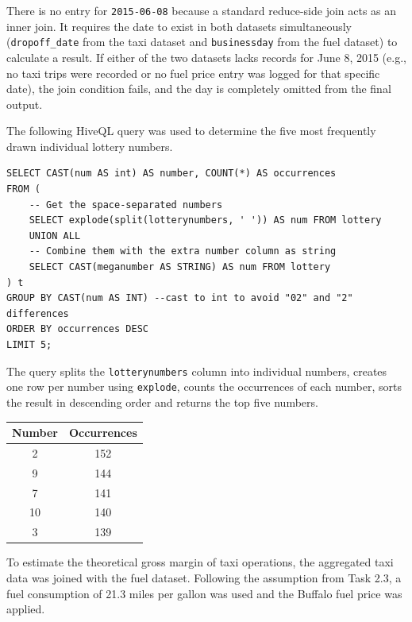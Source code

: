 \documentclass[12pt,ngerman]{scrartcl}
\begin{document}
There is no entry for \texttt{2015-06-08} because a standard reduce-side join acts as an inner join.
It requires the date to exist in both datasets simultaneously (\texttt{dropoff\_date} from the taxi dataset and \texttt{businessday} from the fuel dataset) to calculate a result.
If either of the two datasets lacks records for June 8, 2015 (e.g., no taxi trips were recorded or no fuel price entry was logged for that specific date), the join condition fails, and the day is completely omitted from the final output.

\newpage
{}
\subexercise{}

The following HiveQL query was used to determine the five most frequently drawn individual lottery numbers.

\begin{verbatim}
SELECT CAST(num AS int) AS number, COUNT(*) AS occurrences
FROM (
    -- Get the space-separated numbers
    SELECT explode(split(lotterynumbers, ' ')) AS num FROM lottery
    UNION ALL
    -- Combine them with the extra number column as string
    SELECT CAST(meganumber AS STRING) AS num FROM lottery 
) t
GROUP BY CAST(num AS INT) --cast to int to avoid "02" and "2" differences
ORDER BY occurrences DESC
LIMIT 5;
\end{verbatim}

The query splits the \texttt{lotterynumbers} column into individual numbers, creates one row per number using \texttt{explode}, counts the occurrences of each number, sorts the result in descending order and returns the top five numbers.

\begin{center}
\begin{tabular}{|c|c|}
\hline
Number & Occurrences \\
\hline
2 & 152 \\
9 & 144 \\
7 & 141 \\
10 & 140 \\
3 & 139 \\
\hline
\end{tabular}
\end{center}

\newpage
\subexercise{}

To estimate the theoretical gross margin of taxi operations, the aggregated taxi data was joined with the fuel dataset. Following the assumption from Task 2.3, a fuel consumption of 21.3 miles per gallon was used and the Buffalo fuel price was applied.
\end{document}
